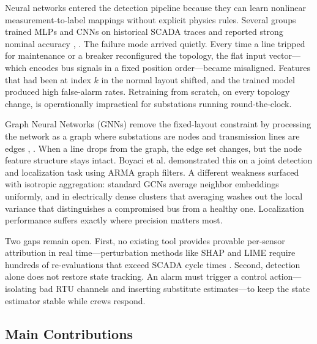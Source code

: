 \documentclass[conference]{IEEEtran}
\begin{document}
Neural networks entered the detection pipeline because they can learn nonlinear measurement-to-label mappings without explicit physics rules. Several groups trained MLPs and CNNs on historical SCADA traces and reported strong nominal accuracy \cite{b5}, \cite{b6}. The failure mode arrived quietly. Every time a line tripped for maintenance or a breaker reconfigured the topology, the flat input vector---which encodes bus signals in a fixed position order---became misaligned. Features that had been at index $k$ in the normal layout shifted, and the trained model produced high false-alarm rates. Retraining from scratch, on every topology change, is operationally impractical for substations running round-the-clock.

Graph Neural Networks (GNNs) remove the fixed-layout constraint by processing the network as a graph where substations are nodes and transmission lines are edges \cite{b2}, \cite{b10}. When a line drops from the graph, the edge set changes, but the node feature structure stays intact. Boyaci et al. \cite{b10} demonstrated this on a joint detection and localization task using ARMA graph filters. A different weakness surfaced with isotropic aggregation: standard GCNs average neighbor embeddings uniformly, and in electrically dense clusters that averaging washes out the local variance that distinguishes a compromised bus from a healthy one. Localization performance suffers exactly where precision matters most.

Two gaps remain open. First, no existing tool provides provable per-sensor attribution in real time---perturbation methods like SHAP and LIME require hundreds of re-evaluations that exceed SCADA cycle times \cite{b15}. Second, detection alone does not restore state tracking. An alarm must trigger a control action---isolating bad RTU channels and inserting substitute estimates---to keep the state estimator stable while crews respond.

\subsection{Main Contributions}
\end{document}

